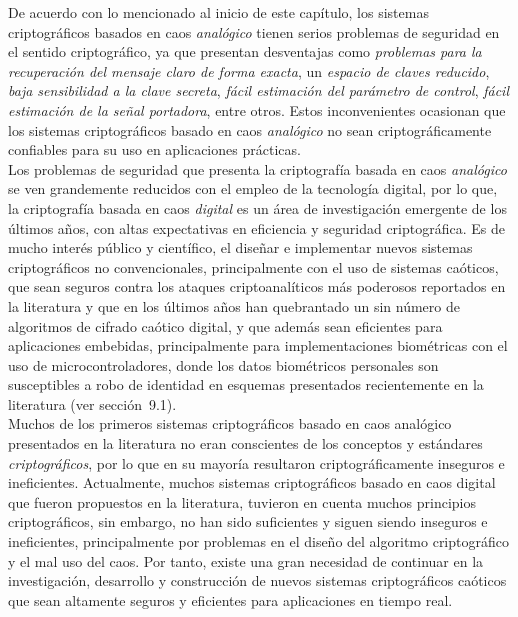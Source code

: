 De acuerdo con lo mencionado al inicio de este capítulo, los sistemas criptográficos basados en caos \textit{analógico} tienen serios problemas de seguridad en el sentido criptográfico, ya que presentan desventajas como \textit{problemas para la recuperación del mensaje claro de forma exacta}, un \textit{espacio de claves reducido}, \textit{baja sensibilidad a la clave secreta}, \textit{fácil estimación del parámetro de control}, \textit{fácil estimación de la señal portadora}, entre otros. Estos inconvenientes ocasionan que los sistemas criptográficos basado en caos \textit{analógico} no sean criptográficamente confiables para su uso en aplicaciones prácticas.  \\

Los problemas de seguridad que presenta la criptografía basada en caos \textit{analógico} se ven grandemente reducidos con el empleo de la tecnología digital, por lo que, la criptografía basada en caos \textit{digital} es un área de investigación emergente de los últimos años, con altas expectativas en eficiencia y seguridad criptográfica. Es de mucho interés público y científico, el diseñar e implementar nuevos sistemas criptográficos no convencionales, principalmente con el uso de sistemas caóticos, que sean seguros contra los ataques criptoanalíticos más poderosos reportados en la literatura y que en los últimos años han quebrantado un sin número de algoritmos de cifrado caótico digital, y que además sean eficientes para aplicaciones embebidas, principalmente para implementaciones biométricas con el uso de microcontroladores, donde los datos biométricos personales son susceptibles a robo de identidad en esquemas presentados recientemente en la literatura (ver sección~9.1).  \\

Muchos de los primeros sistemas criptográficos basado en caos analógico presentados en la literatura no eran conscientes de los conceptos y estándares \textit{criptográficos}, por lo que en su mayoría resultaron criptográficamente inseguros e ineficientes. Actualmente, muchos sistemas criptográficos basado en caos digital que fueron propuestos en la literatura, tuvieron en cuenta muchos principios criptográficos, sin embargo, no han sido suficientes y siguen siendo inseguros e ineficientes, principalmente por problemas en el diseño del algoritmo criptográfico y el mal uso del caos. Por tanto, existe una gran necesidad de continuar en la investigación, desarrollo y construcción de nuevos sistemas criptográficos caóticos que sean altamente seguros y eficientes para aplicaciones en tiempo real.
             
